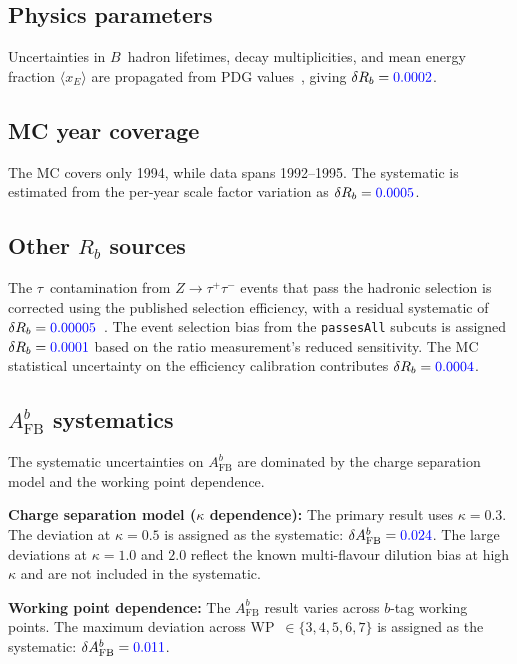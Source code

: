 \documentclass[11pt,a4paper]{article}
\newcommand{\measured}[1]{\textcolor{blue}{#1}}
\begin{document}
\subsection{Physics parameters}
\label{sec:syst-physparam}

Uncertainties in $B$~hadron lifetimes, decay multiplicities, and mean
energy fraction $\langle x_E \rangle$ are propagated from PDG
values~\cite{PDG:2024}, giving $\delta R_b = \measured{0.0002}$.

\subsection{MC year coverage}
\label{sec:syst-mc-year}

The MC covers only 1994, while data spans 1992--1995.  The systematic is
estimated from the per-year scale factor variation as
$\delta R_b = \measured{0.0005}$.

\subsection{Other $R_b$ sources}

The $\tau$~contamination from $Z \to \tau^+\tau^-$ events that pass the
hadronic selection is corrected using the published selection efficiency,
with a residual systematic of $\delta R_b = \measured{0.00005}$~\cite{ALEPH:sigma_had}.
The event selection bias from the \texttt{passesAll} subcuts is assigned
$\delta R_b = \measured{0.0001}$ based on the ratio measurement's
reduced sensitivity.  The MC statistical uncertainty on the efficiency
calibration contributes $\delta R_b = \measured{0.0004}$.

\subsection{$A_\mathrm{FB}^b$ systematics}
\label{sec:syst-afb}

The systematic uncertainties on $A_\mathrm{FB}^b$ are dominated by
the charge separation model and the working point dependence.

\textbf{Charge separation model ($\kappa$ dependence):}
The primary result uses $\kappa = 0.3$.  The deviation at $\kappa = 0.5$
is assigned as the systematic: $\delta A_\mathrm{FB}^b = \measured{0.024}$.
The large deviations at $\kappa = 1.0$ and $2.0$ reflect the known
multi-flavour dilution bias at high $\kappa$ and are not included in the
systematic.

\textbf{Working point dependence:}
The $A_\mathrm{FB}^b$ result varies across $b$-tag working points.  The
maximum deviation across WP~$\in \{3, 4, 5, 6, 7\}$ is assigned as the
systematic: $\delta A_\mathrm{FB}^b = \measured{0.011}$.
\end{document}
